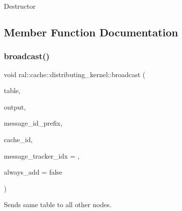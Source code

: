 Destructor 

\subsection{Member Function Documentation}
\mbox{\label{classral_1_1cache_1_1distributing__kernel_a943284f948c1f1486b04e6b02cdc3e19}} 
\subsubsection{\texorpdfstring{broadcast()}{broadcast()}}
{\footnotesize\ttfamily void ral\+::cache\+::distributing\+\_\+kernel\+::broadcast (\begin{DoxyParamCaption}\item[{std\+::unique\+\_\+ptr$<$ \hyperlink{classral_1_1frame_1_1BlazingTable}{ral\+::frame\+::\+Blazing\+Table} $>$}]{table,  }\item[{\hyperlink{classral_1_1cache_1_1CacheMachine}{ral\+::cache\+::\+Cache\+Machine} $\ast$}]{output,  }\item[{std\+::string}]{message\+\_\+id\+\_\+prefix,  }\item[{std\+::string}]{cache\+\_\+id,  }\item[{std\+::size\+\_\+t}]{message\+\_\+tracker\+\_\+idx = {},  }\item[{bool}]{always\+\_\+add = {\ttfamily false} }\end{DoxyParamCaption})}



Sends same table to all other nodes. 


